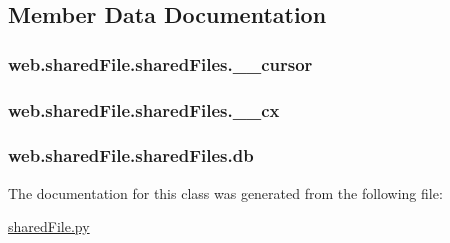 \subsection{Member Data Documentation}
\hypertarget{classweb_1_1shared_file_1_1shared_files_a6ff1f50881c0f681cb76284dfc13c05d}{
\subsubsection[{\-\_\-\-\_\-cursor}]{\setlength{\rightskip}{0pt plus 5cm}web.\-shared\-File.\-shared\-Files.\-\_\-\-\_\-cursor\hspace{0.3cm}{\ttfamily [private]}}}\label{classweb_1_1shared_file_1_1shared_files_a6ff1f50881c0f681cb76284dfc13c05d}
\hypertarget{classweb_1_1shared_file_1_1shared_files_aac40ba4b81960d0e32655f143946f728}{
\subsubsection[{\-\_\-\-\_\-cx}]{\setlength{\rightskip}{0pt plus 5cm}web.\-shared\-File.\-shared\-Files.\-\_\-\-\_\-cx\hspace{0.3cm}{\ttfamily [private]}}}\label{classweb_1_1shared_file_1_1shared_files_aac40ba4b81960d0e32655f143946f728}
\hypertarget{classweb_1_1shared_file_1_1shared_files_a8ee408cb0bc43c60c5274f7d44e49391}{
\subsubsection[{db}]{\setlength{\rightskip}{0pt plus 5cm}web.\-shared\-File.\-shared\-Files.\-db}}\label{classweb_1_1shared_file_1_1shared_files_a8ee408cb0bc43c60c5274f7d44e49391}


The documentation for this class was generated from the following file\-:\begin{DoxyCompactItemize}
\item 
\hyperlink{shared_file_8py}{shared\-File.\-py}\end{DoxyCompactItemize}
